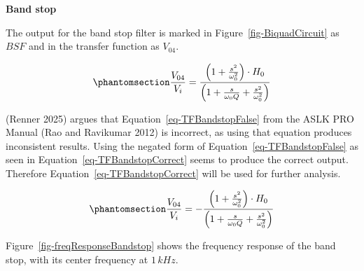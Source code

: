 \documentclass[
  letterpaper,
]{scrbook}
\begin{document}
\textbf{Band stop}

The output for the band stop filter is marked in
Figure~\ref{fig-BiquadCircuit} as \(BSF\) and in the transfer function
as \(V_{04}\).

\begin{equation}\phantomsection\label{eq-TFBandstopFalse}{
\frac{V_{04}}{V_i} = \frac{\left( 1 + \frac{s^2}{\omega_0^2} \right) \cdot H_0}{\left( 1 + \frac{s}{\omega_0 Q} + \frac{s^2}{\omega_0^2} \right)}
}\end{equation}

(Renner 2025) argues that Equation~\ref{eq-TFBandstopFalse} from the
ASLK PRO Manual (Rao and Ravikumar 2012) is incorrect, as using that
equation produces inconsistent results. Using the negated form of
Equation~\ref{eq-TFBandstopFalse} as seen in
Equation~\ref{eq-TFBandstopCorrect} seems to produce the correct output.
Therefore Equation~\ref{eq-TFBandstopCorrect} will be used for further
analysis.

\begin{equation}\phantomsection\label{eq-TFBandstopCorrect}{
\frac{V_{04}}{V_i} = - \frac{\left( 1 + \frac{s^2}{\omega_0^2} \right) \cdot H_0}{\left( 1 + \frac{s}{\omega_0 Q} + \frac{s^2}{\omega_0^2} \right)}
}\end{equation}

Figure~\ref{fig-freqResponseBandstop} shows the frequency response of
the band stop, with its center frequency at \(1\,kHz\).
\end{document}
